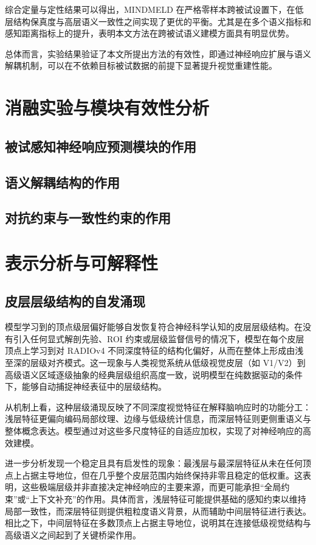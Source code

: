综合定量与定性结果可以得出，MINDMELD 在严格零样本跨被试设置下，在低层结构保真度与高层语义一致性之间实现了更优的平衡。尤其是在多个语义指标和感知距离指标上的提升，表明本文方法在跨被试语义建模方面具有明显优势。

总体而言，实验结果验证了本文所提出方法的有效性，即通过神经响应扩展与语义解耦机制，可以在不依赖目标被试数据的前提下显著提升视觉重建性能。


\section{消融实验与模块有效性分析}

\subsection{被试感知神经响应预测模块的作用}

\subsection{语义解耦结构的作用}

\subsection{对抗约束与一致性约束的作用}


\section{表示分析与可解释性}

\subsection{皮层层级结构的自发涌现}

模型学习到的顶点级层偏好能够自发恢复符合神经科学认知的皮层层级结构。在没有引入任何显式解剖先验、ROI 约束或层级监督信号的情况下，模型在每个皮层顶点上学习到对 RADIOv4 不同深度特征的结构化偏好，从而在整体上形成由浅至深的层级对齐模式。这一现象与人类视觉系统从低级视觉皮层（如 V1/V2）到高级语义区域逐级抽象的经典层级组织高度一致，说明模型在纯数据驱动的条件下，能够自动捕捉神经表征中的层级结构。

从机制上看，这种层级涌现反映了不同深度视觉特征在解释脑响应时的功能分工：浅层特征更偏向编码局部纹理、边缘与低级统计信息，而深层特征则更侧重语义与整体概念表达。模型通过对这些多尺度特征的自适应加权，实现了对神经响应的高效建模。

进一步分析发现一个稳定且具有启发性的现象：最浅层与最深层特征从未在任何顶点上占据主导地位，但在几乎整个皮层范围内始终保持非零且稳定的低权重。这表明，这些极端层级并非直接决定神经响应的主要来源，而更可能承担“全局约束”或“上下文补充”的作用。具体而言，浅层特征可能提供基础的感知约束以维持局部一致性，而深层特征则提供粗粒度语义背景，从而辅助中间层特征进行表达。相比之下，中间层特征在多数顶点上占据主导地位，说明其在连接低级视觉结构与高级语义之间起到了关键桥梁作用。

